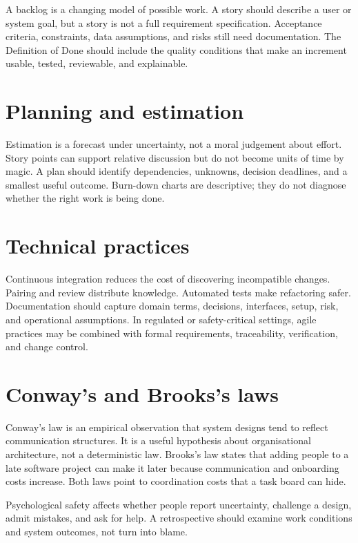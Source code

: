 A backlog is a changing model of possible work. A story should describe a user or system goal, but a story is not a full requirement specification. Acceptance criteria, constraints, data assumptions, and risks still need documentation. The Definition of Done should include the quality conditions that make an increment usable, tested, reviewable, and explainable.

\section{Planning and estimation}
Estimation is a forecast under uncertainty, not a moral judgement about effort. Story points can support relative discussion but do not become units of time by magic. A plan should identify dependencies, unknowns, decision deadlines, and a smallest useful outcome. Burn-down charts are descriptive; they do not diagnose whether the right work is being done.

\section{Technical practices}
Continuous integration reduces the cost of discovering incompatible changes. Pairing and review distribute knowledge. Automated tests make refactoring safer. Documentation should capture domain terms, decisions, interfaces, setup, risk, and operational assumptions. In regulated or safety-critical settings, agile practices may be combined with formal requirements, traceability, verification, and change control.

\section{Conway's and Brooks's laws}
Conway's law is an empirical observation that system designs tend to reflect communication structures. It is a useful hypothesis about organisational architecture, not a deterministic law. Brooks's law states that adding people to a late software project can make it later because communication and onboarding costs increase. Both laws point to coordination costs that a task board can hide.

Psychological safety affects whether people report uncertainty, challenge a design, admit mistakes, and ask for help. A retrospective should examine work conditions and system outcomes, not turn into blame.

